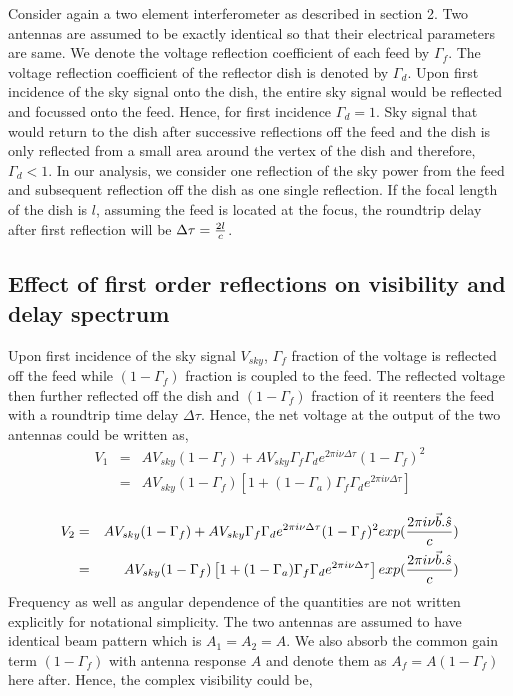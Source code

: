 \documentclass[12pt,preprint]{aastex}
\begin{document}
Consider again a two element interferometer as described in section 2. Two antennas are assumed to be exactly identical so that their electrical parameters are same. We denote the voltage reflection coefficient of each feed by $\Gamma_{f}$. The voltage reflection coefficient of the reflector dish is denoted by $\Gamma_{d}$. Upon first incidence of the sky signal onto the dish, the entire sky signal would be reflected and focussed onto the feed. Hence, for first incidence $\Gamma_{d}=1$. Sky signal that would return to the dish after successive reflections off the feed and the dish is only reflected from a small area around the vertex of the dish and therefore, $\Gamma_{d}<1$. In our analysis, we consider one reflection of the sky power from the feed and subsequent reflection off the dish as one single reflection. If the focal length of the dish is $l$, assuming the feed is located at the focus, the roundtrip delay after first reflection will be $\Delta \tau = {2l \over c}$. 


\subsection{Effect of first order reflections on visibility and delay spectrum}
Upon first incidence of the sky signal $V_{sky}$, $\Gamma_{f}$ fraction of the voltage is reflected off the feed while $(1-\Gamma_{f})$ fraction is coupled to the feed. The reflected voltage then further reflected off the dish and $(1-\Gamma_{f}) $ fraction of it reenters the feed with a roundtrip time delay $\Delta \tau$. Hence, the net voltage at the output of the two antennas could be written as,    
\begin{eqnarray}
V_{1} & = & A V_{sky}(1-\Gamma_{f}) + A V_{sky} \Gamma_{f} \Gamma_{d} e^{2\pi i\nu \Delta \tau}  (1-\Gamma_{f})^{2}\nonumber\\
         & = & A V_{sky} (1-\Gamma_{f}) \left [ 1+ (1-\Gamma_{a})\Gamma_{f} \Gamma_{d} e^{2\pi i\nu \Delta \tau} \right]\nonumber\\
\label{eq4}
\end{eqnarray}
\begin{eqnarray}
V_{2} & = & A V_{sky}(1-\Gamma_{f}) + A V_{sky} \Gamma_{f} \Gamma_{d} e^{2\pi i\nu \Delta \tau} (1-\Gamma_{f})^{2}exp({2\pi i \nu \vec{b}.\hat{s} \over c} )\nonumber\\
         & = & A V_{sky} (1-\Gamma_{f}) \left [ 1+(1-\Gamma_{a}) \Gamma_{f} \Gamma_{d} e^{2\pi i\nu \Delta \tau}  \right]exp({2\pi i \nu \vec{b}.\hat{s} \over c} )\nonumber\\
\label{eq5}
\end{eqnarray}
Frequency as well as angular dependence of the quantities are not written explicitly for notational simplicity. 
The two antennas are assumed to have identical beam pattern which is $A_{1}=A_{2} =A$. We also absorb the common gain term $(1-\Gamma_{f})$ with antenna response $A$ and denote them as $A_{f}= A(1-\Gamma_{f})$ here after. Hence, the complex visibility could be, 
\end{document}
